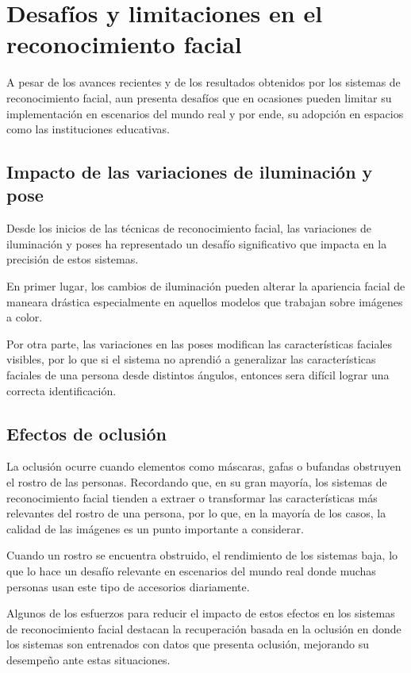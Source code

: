 \section{Desafíos y limitaciones en el reconocimiento facial}

A pesar de los avances recientes y de los resultados obtenidos por los sistemas de reconocimiento facial, aun presenta desafíos que en ocasiones pueden limitar su implementación en escenarios del mundo real y por ende, su adopción en espacios como las instituciones educativas.


\subsection{Impacto de las variaciones de iluminación y pose}

Desde los inicios de las técnicas de reconocimiento facial, las variaciones de iluminación y poses ha representado un desafío significativo que impacta en la precisión de estos sistemas. \cite{EA10}

En primer lugar, los cambios de iluminación pueden alterar la apariencia facial de maneara drástica especialmente en aquellos modelos que trabajan sobre imágenes a color.

Por otra parte, las variaciones en las poses modifican las características faciales visibles, por lo que si el sistema no aprendió a generalizar las características faciales de una persona desde distintos ángulos, entonces sera difícil lograr una correcta identificación.


\subsection{Efectos de oclusión}

La oclusión ocurre cuando elementos como máscaras, gafas o bufandas obstruyen el rostro de las personas. Recordando que, en su gran mayoría, los sistemas de reconocimiento facial tienden a extraer o transformar las características más relevantes del rostro de una persona, por lo que, en la mayoría de los casos, la calidad de las imágenes es un punto importante a considerar. \cite{EA11}

Cuando un rostro se encuentra obstruido, el rendimiento de los sistemas baja, lo que lo hace un desafío relevante en escenarios del mundo real donde muchas personas usan este tipo de accesorios diariamente.

Algunos de los esfuerzos para reducir el impacto de estos efectos en los sistemas de reconocimiento facial destacan la recuperación basada en la oclusión en donde los sistemas son entrenados con datos que presenta oclusión, mejorando su desempeño ante estas situaciones.


